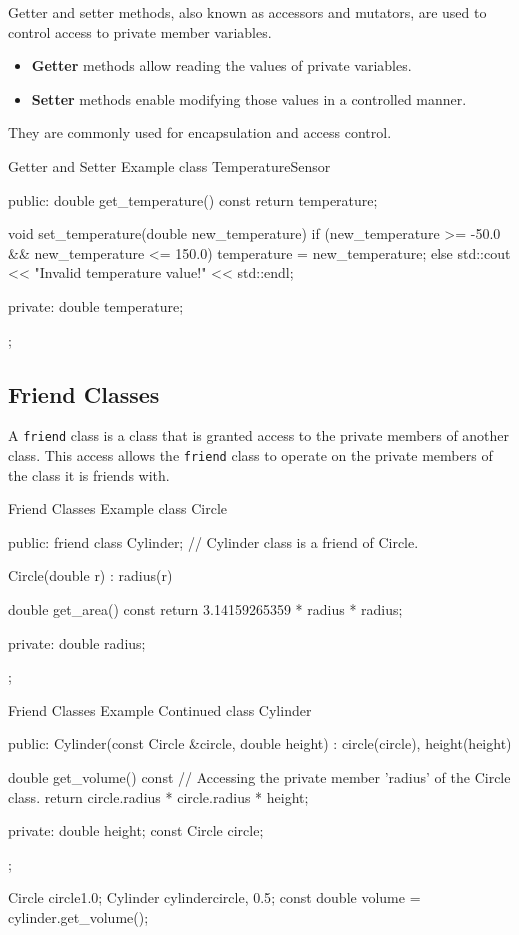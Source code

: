 Getter and setter methods, also known as accessors and mutators, are used to control access to private member variables.

\begin{itemize}
    \item \textbf{Getter} methods allow reading the values of private variables.
    \item \textbf{Setter} methods enable modifying those values in a controlled manner.
\end{itemize}

They are commonly used for encapsulation and access control.

\begin{neonlisting}[language=C++]{Getter and Setter Example}
class TemperatureSensor {
public:
    double get_temperature() const {
        return temperature;
    }

    void set_temperature(double new_temperature) {
        if (new_temperature >= -50.0 && new_temperature <= 150.0) {
            temperature = new_temperature;
        } else {
            std::cout << "Invalid temperature value!" << std::endl;
        }
    }

private:
    double temperature;
};
\end{neonlisting}

\subsection{Friend Classes}

A \texttt{friend} class is a class that is granted access to the private members of another class. This access allows the \texttt{friend} class to operate on the private members of the class it is friends with.

\begin{neonlisting}[language=C++]{Friend Classes Example}
class Circle {
public:
    friend class Cylinder; // Cylinder class is a friend of Circle.

    Circle(double r) : radius(r) {}

    double get_area() const {
        return 3.14159265359 * radius * radius;
    }

private:
    double radius;
};
\end{neonlisting}

\begin{neonlisting}[language=C++]{Friend Classes Example Continued}
class Cylinder {
public:
    Cylinder(const Circle &circle, double height) : circle(circle), height(height) {}
    
    double get_volume() const {
        // Accessing the private member 'radius' of the Circle class.
        return circle.radius * circle.radius * height;
    }

private:
    double height;
    const Circle circle;
};

Circle circle{1.0};
Cylinder cylinder{circle, 0.5};
const double volume = cylinder.get_volume();
\end{neonlisting}

